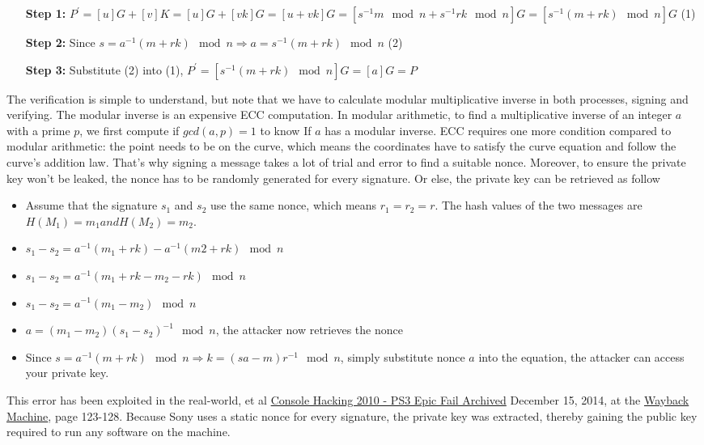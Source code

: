 \begin{itemize}[leftmargin=2.2cm]
  \item[\textbf{Step 1:}] $P^\prime = [u]G + [v]K = [u]G + [vk]G = [u +vk]G = [s^{-1}m \mod n + s^{-1}rk \mod n]G = [s^{-1}(m + rk) \mod n]G$ (1)
  \item[\textbf{Step 2:}] Since $s = a^{-1}(m+rk) \mod n \Rightarrow a = s^{-1}(m+rk) \mod n$ (2)
  \item[\textbf{Step 3:}] Substitute (2) into (1), $P^\prime = [s^{-1}(m + rk) \mod n]G = [a]G = P$
\end{itemize}

The verification is simple to understand, but note that we have to calculate modular multiplicative inverse in both processes, signing and verifying. The modular inverse is an expensive ECC computation. In modular arithmetic, to find a multiplicative inverse of an integer $a$ with a prime $p$, we first compute if $gcd(a, p) = 1$ to know If $a$ has a modular inverse. ECC requires one more condition compared to modular arithmetic: the point needs to be on the curve, which means the coordinates have to satisfy the curve equation and follow the curve’s addition law. That’s why signing a message takes a lot of trial and error to find a suitable nonce. Moreover, to ensure the private key won’t be leaked, the nonce has to be randomly generated for every signature. Or else, the private key can be retrieved as follow

\begin{itemize}
  \item Assume that the signature $s_1$ and $s_2$ use the same nonce, which means $r_1 = r_2 = r$. The hash values of the two messages are $H(M_1) = m_1 and H(M_2) = m_2$.
  \item $s_1 - s_2 = a^{-1} (m_1 + rk) - a^{-1} (m2+rk) \mod n$
  \item $s_1 - s_2 = a^{-1}(m_1 + rk - m_2 - rk) \mod n$
  \item $s_1 - s_2 = a^{-1}(m_1 - m_2) \mod n$
  \item $a = (m_1 - m_2)(s_1 - s_2)^{-1} \mod n$, the attacker now retrieves the nonce
  \item Since $s = a^{-1}(m + rk) \mod n \Rightarrow k = (sa-m) r^{-1} \mod n$, simply substitute nonce $a$ into the equation, the attacker can access your private key.
\end{itemize}

This error has been exploited in the real-world, et al \href{https://events.ccc.de/congress/2010/Fahrplan/attachments/1780_27c3_console_hacking_2010.pdf}{Console Hacking 2010 - PS3 Epic Fail Archived} December 15, 2014, at the \href{https://en.wikipedia.org/wiki/Wayback_Machine}{Wayback Machine}, page 123-128. Because Sony uses a static nonce for every signature, the private key was extracted, thereby gaining the public key required to run any software on the machine.


